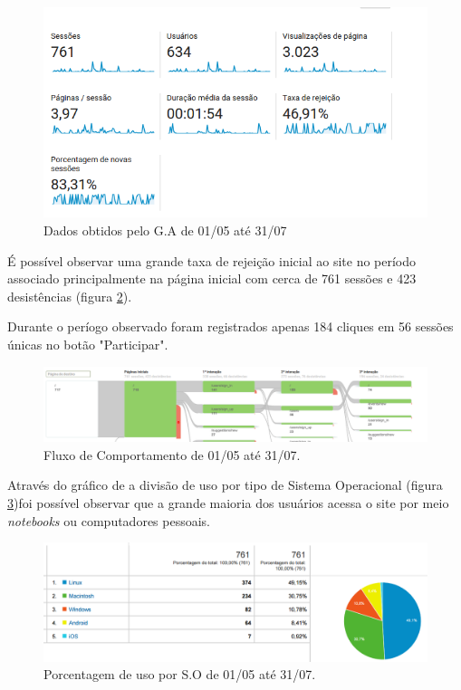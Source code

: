 \begin{figure}[htb]
\includegraphics[width=15cm]{figuras/analytics_1interacao_dados}
\caption{\label{fig:analytics_1interacao_dados} Dados obtidos pelo G.A de 01/05 até 31/07}
\end{figure}

\par É possível observar uma grande taxa de rejeição inicial ao site no período associado principalmente na página inicial com cerca de 761 sessões e 423 desistências (figura \ref{fig:analytics_1ainteracao_fluxo}).
\par Durante o períogo observado foram registrados apenas 184 cliques em 56 sessões únicas no botão "Participar".
\begin{figure}[htb]
\includegraphics[width=15cm]{figuras/analytics_1ainteracao_fluxo}
\caption{\label{fig:analytics_1ainteracao_fluxo} Fluxo de Comportamento de 01/05 até 31/07.}
\end{figure}

\par Através do gráfico de a divisão de uso por tipo de Sistema Operacional (figura \ref{fig:analytics_1interacao_so})foi possível observar que a grande maioria dos usuários acessa o site por meio \emph{notebooks} ou computadores pessoais.
\begin{figure}[htb]
\includegraphics[width=15cm]{figuras/analytics_1interacao_so}
\caption{\label{fig:analytics_1interacao_so} Porcentagem de uso por S.O de 01/05 até 31/07.}
\end{figure}
